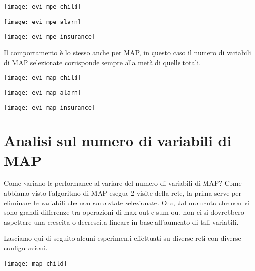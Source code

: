 \begin{minipage}{\linewidth}
	\centering
	\texttt{[image: evi\_mpe\_child]}
	\label{evi_mpe_child} 
\end{minipage}

\begin{minipage}{\linewidth}
	\centering
	\texttt{[image: evi\_mpe\_alarm]}
	\label{evi_mpe_alarm} 
\end{minipage}
 
\begin{minipage}{\linewidth}
	\centering
	\texttt{[image: evi\_mpe\_insurance]}
	\label{evi_mpe_insurance} 
\end{minipage}

Il comportamento è lo stesso anche per MAP, in questo caso il numero di variabili di MAP selezionate corrisponde sempre alla metà di quelle totali.

\begin{minipage}{\linewidth}
	\centering
	\texttt{[image: evi\_map\_child]}
	\label{evi_map_child} 
\end{minipage}

\begin{minipage}{\linewidth}
	\centering
	\texttt{[image: evi\_map\_alarm]}
	\label{evi_map_alarm} 
\end{minipage}
 
\begin{minipage}{\linewidth}
	\centering
	\texttt{[image: evi\_map\_insurance]}
	\label{evi_map_insurance} 
\end{minipage}


\section{Analisi sul numero di variabili di MAP}
Come variano le performance al variare del numero di variabili di MAP? Come abbiamo visto l’algoritmo di MAP esegue 2 visite della rete, la prima serve per eliminare le variabili che non sono state selezionate. Ora, dal momento che non vi sono grandi differenze tra operazioni di max out e sum out non ci si dovrebbero aspettare una crescita o decrescita lineare in base all’aumento di tali variabili. 

Lasciamo qui di seguito alcuni esperimenti effettuati su diverse reti con diverse configurazioni:

\begin{minipage}{\linewidth}
	\centering
	\texttt{[image: map\_child]}
	\label{map_child} 
\end{minipage}

